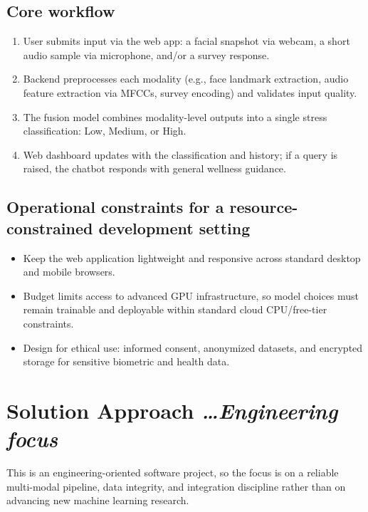 \documentclass[11pt,a4paper]{article}
\newcommand{\BvrHint}[1]{%
  {\normalfont\normalsize\itshape\hfill #1}}
\begin{document}
\subsection{Core workflow}
\begin{enumerate}[leftmargin=0.7cm]
    \item User submits input via the web app: a facial snapshot via webcam, a short audio sample via microphone, and/or a survey response.
    \item Backend preprocesses each modality (e.g., face landmark extraction, audio feature extraction via MFCCs, survey encoding) and validates input quality.
    \item The fusion model combines modality-level outputs into a single stress classification: Low, Medium, or High.
    \item Web dashboard updates with the classification and history; if a query is raised, the chatbot responds with general wellness guidance.
\end{enumerate}

\subsection{Operational constraints for a resource-constrained development setting}
\begin{itemize}[leftmargin=0.7cm]
    \item Keep the web application lightweight and responsive across standard desktop and mobile browsers.
    \item Budget limits access to advanced GPU infrastructure, so model choices must remain trainable and deployable within standard cloud CPU/free-tier constraints.
    \item Design for ethical use: informed consent, anonymized datasets, and encrypted storage for sensitive biometric and health data.
\end{itemize}

\section{Solution Approach %
\BvrHint{\ldots Engineering focus}}
This is an engineering-oriented software project, so the focus is on a reliable multi-modal pipeline, data integrity, and integration discipline rather than on advancing new machine learning research.
\end{document}
